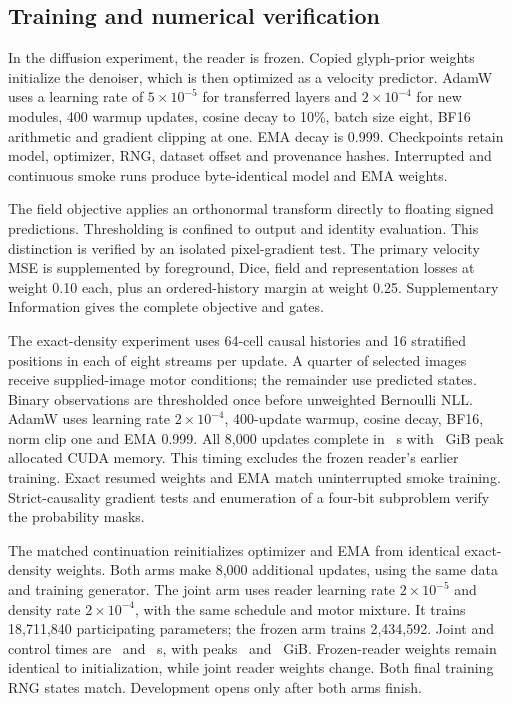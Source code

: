 \subsection*{Training and numerical verification}
In the diffusion experiment, the reader is frozen. Copied glyph-prior weights initialize the denoiser,
which is then optimized as a velocity predictor. AdamW uses a learning rate of
$5\times10^{-5}$ for transferred layers and $2\times10^{-4}$ for new modules,
400 warmup updates, cosine decay to 10\%, batch size eight, BF16 arithmetic and
gradient clipping at one. EMA decay is 0.999. Checkpoints retain model,
optimizer, RNG, dataset offset and provenance hashes. Interrupted and
continuous smoke runs produce byte-identical model and EMA weights.

The field objective applies an orthonormal transform directly to floating
signed predictions. Thresholding is confined to output and identity
evaluation. This distinction is verified by an isolated pixel-gradient test.
The primary velocity MSE is supplemented by foreground, Dice, field and
representation losses at weight 0.10 each, plus an ordered-history margin at
weight 0.25. Supplementary Information gives the complete objective and gates.

The exact-density experiment uses 64-cell causal histories and 16 stratified
positions in each of eight streams per update. A quarter of selected images
receive supplied-image motor conditions; the remainder use predicted states.
Binary observations are thresholded once before unweighted Bernoulli NLL.
AdamW uses learning rate $2\times10^{-4}$, 400-update warmup, cosine decay,
BF16, norm clip one and EMA 0.999. All 8,000 updates complete in
\DensitySeconds\ s with \DensityMemory\ GiB peak allocated CUDA memory.
This timing excludes the frozen reader's earlier training. Exact resumed
weights and EMA match uninterrupted smoke training. Strict-causality gradient
tests and enumeration of a four-bit subproblem verify the probability masks.

The matched continuation reinitializes optimizer and EMA from identical
exact-density weights. Both arms make 8,000 additional updates, using the same
data and training generator. The joint arm uses reader learning rate
$2\times10^{-5}$ and density rate $2\times10^{-4}$, with the same schedule and
motor mixture. It trains 18,711,840 participating parameters; the frozen arm
trains 2,434,592. Joint and control times are \JointTime\ and \ControlTime\ s,
with peaks \JointMemory\ and \ControlMemory\ GiB. Frozen-reader weights remain
identical to initialization, while joint reader weights change. Both final
training RNG states match. Development opens only after both arms finish.

